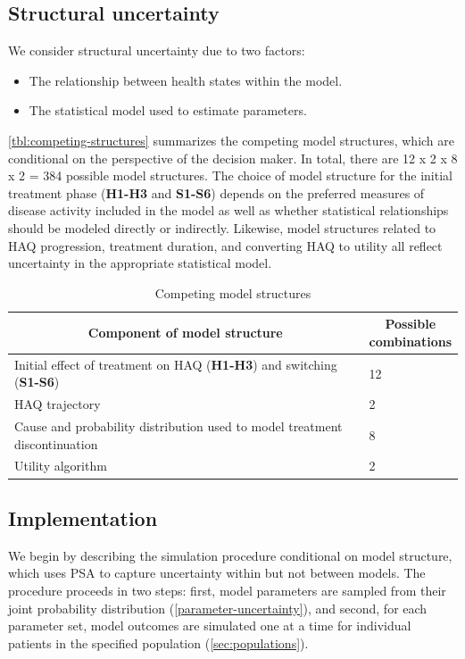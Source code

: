 \documentclass[11pt,final,fleqn]{article}\usepackage[]{graphicx}\usepackage[]{color}
\theoremstyle{plain}
\begin{document}
\subsection{Structural uncertainty}\label{stuctural-uncertainty}
We consider structural uncertainty due to two factors:

\begin{itemize}
\item The relationship between health states within the model.
\item The statistical model used to estimate parameters.
\end{itemize}

\autoref{tbl:competing-structures} summarizes the competing model structures, which are conditional on the perspective of the decision maker. In total, there are 12 x 2 x 8 x 2 = 384 possible model structures. The choice of model structure for the initial treatment phase (\textbf{H1-H3} and \textbf{S1-S6}) depends on the preferred measures of disease activity included in the model as well as whether statistical relationships should be modeled directly or indirectly. Likewise, model structures related to HAQ progression, treatment duration, and converting HAQ to utility all reflect uncertainty in the appropriate statistical model. 

\renewcommand{\arraystretch}{1.5}

\begin{table}[!ht]
\begin{center}
\begin{threeparttable}
\caption{Competing model structures} \label{tbl:competing-structures}
\begin{tabular}{p{0.80\linewidth}p{0.20\linewidth}}
\hline
\multicolumn{1}{c}{Component of model structure} & \multicolumn{1}{c}{Possible combinations} \\
\hline
Initial effect of treatment on HAQ (\textbf{H1-H3}) and switching (\textbf{S1-S6}) & 12  \\
HAQ trajectory & 2 \\
Cause and probability distribution used to model treatment discontinuation & 8 \\
Utility algorithm & 2 \\
\hline
\end{tabular}
\end{threeparttable}
\end{center}
\end{table}\renewcommand{\arraystretch}{1}


\subsection{Implementation}\label{implementation}
We begin by describing the simulation procedure conditional on model structure, which uses PSA to capture uncertainty within but not between models. The procedure proceeds in two steps: first, model parameters are sampled from their joint probability distribution (\autoref{parameter-uncertainty}), and second, for each parameter set, model outcomes are simulated one at a time for individual patients in the specified population (\autoref{sec:populations}).   
\end{document}
